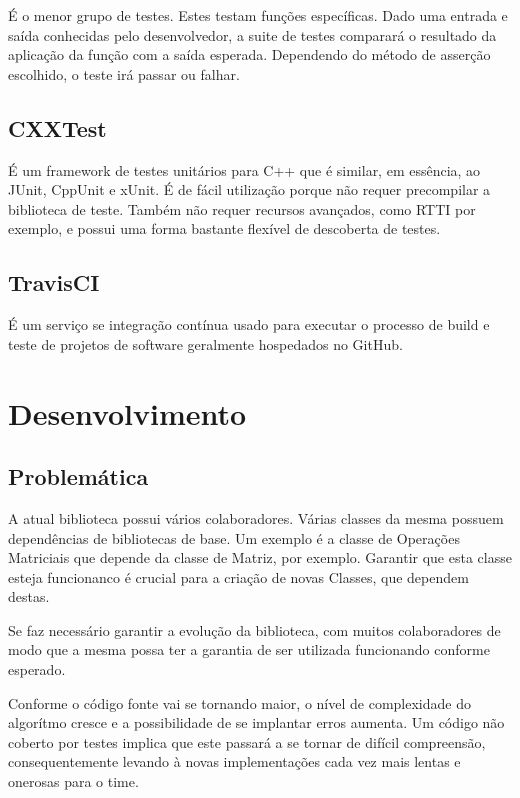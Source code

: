 \documentclass[
	article,			%
	12pt,				%
	oneside,			%
	a4paper,			%
	english,			
	brazil,
	sumario=tradicional
	]{abntex2}
\begin{document}
É o menor grupo de testes. Estes testam funções específicas. Dado uma entrada e saída conhecidas pelo desenvolvedor, a suite de testes comparará o resultado da aplicação da função com a saída esperada. Dependendo do método de asserção escolhido, o teste irá passar ou falhar.

\pagebreak
\subsection{CXXTest}
É um framework de testes unitários para C++ que é similar, em essência, ao JUnit, CppUnit e xUnit. É de fácil utilização porque não requer precompilar a biblioteca de teste. Também não requer recursos avançados, como RTTI por exemplo, e possui uma forma bastante flexível de descoberta de testes.

\pagebreak
\subsection{TravisCI}
É um serviço se integração contínua usado para executar o processo de build e teste de projetos de software geralmente hospedados no GitHub.


\pagebreak
\section{Desenvolvimento}

\subsection{Problemática}

A atual biblioteca possui vários colaboradores. Várias classes da mesma possuem dependências de bibliotecas de base. Um exemplo é a classe de Operações Matriciais que depende da classe de Matriz, por exemplo. Garantir que esta classe esteja funcionanco é crucial para a criação de novas Classes, que dependem destas.

Se faz necessário garantir a evolução da biblioteca, com muitos colaboradores de modo que a mesma possa ter a garantia de ser utilizada funcionando conforme esperado.

Conforme o código fonte vai se tornando maior, o nível de complexidade do algorítmo cresce e a possibilidade de se implantar erros aumenta. Um código não coberto por testes implica que este passará a se tornar de difícil compreensão, consequentemente levando à novas implementações cada vez mais lentas e onerosas para o time.
\end{document}
